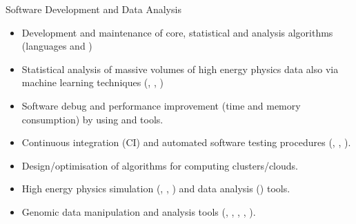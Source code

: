 \begin{cvskills}
\cvskill
{Software Development and Data Analysis}%
{
\begin{minipage}{0.49\textwidth}
\vspace{0.3em}
\begin{itemize}[labelwidth=\the\widest,align=right,leftmargin=!,labelsep=1pt,noitemsep]
\item[\custItem] Development and maintenance of core, statistical and analysis
algorithms (languages \textsc{\color{awesome}{C/C++}} and 
\textsc{\color{awesome}{Python}})
\item[\custItem] Statistical analysis of massive volumes of high energy physics
data also via machine learning techniques (\textsc{\color{awesome}{TMVA}},
\textsc{\color{awesome}{BDT}}, \textsc{\color{awesome}{TensorFlow}})
\item[\custItem] Software debug and performance improvement (time and memory
consumption) by using \textsc{\color{awesome}{gdb}} and
\textsc{\color{awesome}{Valgrind}} tools.
\end{itemize}
\end{minipage}
\hfill
\begin{minipage}{0.49\textwidth}
\vspace{0.3em}
\begin{itemize}[labelwidth=\the\widest,align=right,leftmargin=!,labelsep=1pt,noitemsep]
\item[\custItem] Continuous integration (CI) and automated software testing procedures
(\textsc{\color{awesome}{Bamboo}}, \textsc{\color{awesome}{Jenkins}},
\textsc{\color{awesome}{Gitlab}}).
\item[\custItem] Design/optimisation of algorithms for computing
clusters/clouds.
\item[\custItem] High energy physics simulation
(\textsc{\color{awesome}{Powheg}}, \textsc{\color{awesome}{Pythia}},
\textsc{\color{awesome}{Madgraph}}) and data analysis
(\textsc{\color{awesome}{ROOT}}) tools.
\item[\custItem] Genomic data manipulation and analysis tools
(\textsc{\color{awesome}{Samtools}}, \textsc{\color{awesome}{Vcftools}},
\textsc{\color{awesome}{Bwa/Bwa-mem2}}, \textsc{\color{awesome}{GATK}},
\textsc{\color{awesome}{Freebayes}}).
\end{itemize}
\end{minipage}
}


\end{cvskills}
